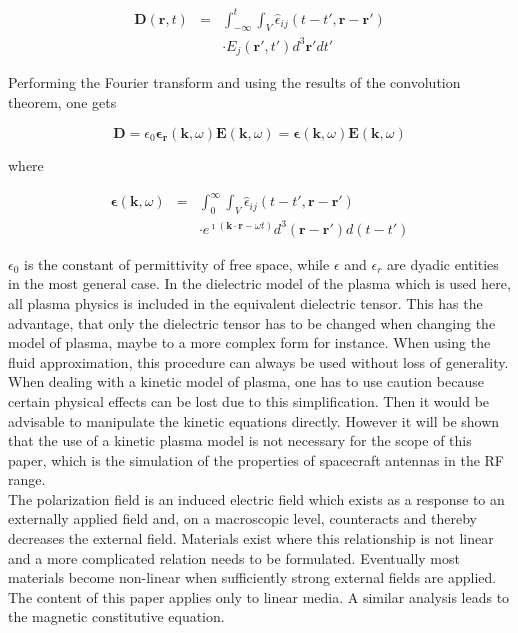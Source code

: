 \documentclass[draft,ras]{agutex}
\begin{document}
\begin{article}
\begin{eqnarray}
    \mathbf{D}(\mathbf{r},t)&=&\int_{-\infty}^t\int_V\hat{\epsilon}_{ij}(t-t',\mathbf{r}-\mathbf{r'}) \\
&&\cdot E_j(\mathbf{r'},t')d^3\mathbf{r'}dt'\nonumber
\end{eqnarray}

Performing the Fourier transform and using the results of the convolution theorem, one gets

\begin{equation}
\mathbf{D} = \epsilon_0 \mathbf{\epsilon_r}(\mathbf{k},\omega) \mathbf{E}(\mathbf{k},\omega) = \mathbf{\epsilon}(\mathbf{k},\omega) \mathbf{E}(\mathbf{k},\omega)\label{constitutive_1_vacuum}
\end{equation}

where

\begin{eqnarray}
    \mathbf{\epsilon}(\mathbf{k},\omega)&=&\int_{0}^\infty\int_V\hat{\epsilon}_{ij}(t-t',\mathbf{r}-\mathbf{r'}) \\
&& \cdot e^{\imath (\mathbf{k}\cdot \mathbf{r}- \omega t)}d^3\mathbf{(r-r')}d(t-t') \nonumber
\end{eqnarray}

$\epsilon_0$ is the constant of permittivity of free space, while $\epsilon$ and $\epsilon_r$
are dyadic entities in the most general case. In the dielectric model of the plasma which is used here, all plasma physics is included in the equivalent dielectric tensor. This has the advantage, that only the dielectric tensor has to be changed when changing the model of plasma, maybe to a more complex form for instance. When using the fluid approximation, this procedure can always be used without loss of generality. When dealing with a kinetic model of plasma, one has to use caution because certain physical effects can be lost due to this simplification. Then it would be advisable to manipulate the kinetic equations directly. However it will be shown that the use of a kinetic plasma model is not necessary for the scope of this paper, which is the simulation of the properties of spacecraft antennas in the RF range.\\

The polarization field is an induced electric field which exists as a response to an externally applied field and, on a macroscopic level, counteracts and thereby decreases the external field. Materials exist where this relationship is not linear and a more complicated relation needs to be formulated. Eventually most materials become non-linear when
sufficiently strong external fields are applied. The content of this paper applies only to linear media. A similar analysis leads to the magnetic constitutive equation.\\




\end{article}
\end{document}
